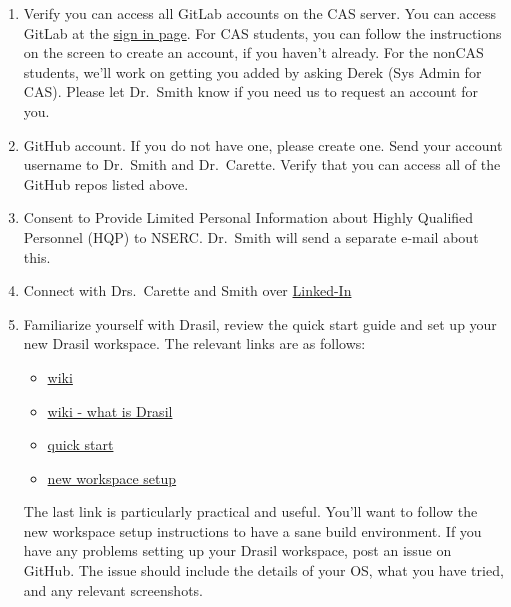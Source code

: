 \documentclass[12pt]{article}
\begin{document}
\begin{enumerate} 
    
\item Verify you can access all GitLab accounts on the CAS server.  You can
access GitLab at the \href{https://gitlab.cas.mcmaster.ca/users/sign_in} {sign
in page}.  For CAS students, you can follow the instructions on the screen to
create an account, if you haven't already.  For the nonCAS students, we'll work
on getting you added by asking Derek (Sys Admin for CAS).  Please let Dr.\ Smith
know if you need us to request an account for you.

\item GitHub account.  If you do not have one, please create one.  Send your
account username to Dr.\ Smith and Dr.\ Carette.  Verify that you can access all
of the GitHub repos listed above.

\item Consent to Provide Limited Personal Information about Highly Qualified
Personnel (HQP) to NSERC.  Dr.\ Smith will send a separate e-mail about this.

\item Connect with Drs.\ Carette and Smith over \href{https://www.linkedin.com/}
{Linked-In}

\item Familiarize yourself with Drasil, review the quick start guide and set up
your new Drasil workspace.  The relevant links are as follows:

\begin{itemize}

\item \href{https://github.com/JacquesCarette/Drasil/wiki} {wiki}

\item \href{https://github.com/JacquesCarette/Drasil/wiki#what-is-drasil-cont}
{wiki - what is Drasil}

\item \href{https://github.com/JacquesCarette/Drasil#quick-start} {quick start}

\item \href{https://github.com/JacquesCarette/Drasil/wiki/New-Workspace-Setup}
{new workspace setup}

\end{itemize}

The last link is particularly practical and useful.  You'll want to follow the
new workspace setup instructions to have a sane build environment.  If you have
any problems setting up your Drasil workspace, post an issue on GitHub.  The
issue should include the details of your OS, what you have tried, and any
relevant screenshots.


\end{enumerate}
\end{document}
